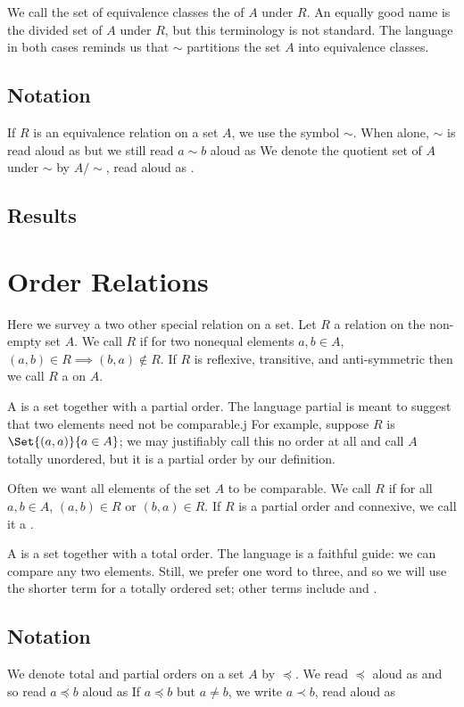 We call the set of equivalence classes the  of $A$ under $R$.
An equally good name is the divided set of $A$ under $R$, but this terminology is not standard.
The language in both cases reminds us that $\sim$ partitions the set $A$ into equivalence classes.

\subsection{Notation}
If $R$ is an equivalence relation on a set $A$, we use the symbol $\sim$.
When alone, $\sim$ is read aloud as  but we still read $a \sim b$ aloud as 
We denote the quotient set of  $A$ under $\sim$ by $A/\sim$, read aloud as .

\subsection{Results}

\section{Order Relations}

Here we survey a two other special relation on a set.
Let $R$ a relation on the non-empty set $A$.
We call $R$  if for two nonequal elements $a, b \in A$, $(a, b) \in R \implies (b, a) \not\in R$.
If $R$ is reflexive, transitive, and anti-symmetric then we call $R$ a  on $A$.

A  is a set together with a partial order.
The language partial is meant to suggest that two elements need not be comparable.j
For example, suppose $R$ is $\Set{(a,a)}{a \in A}$; we may justifiably call this no order at all and call $A$ totally unordered, but it is a partial order by our definition.

Often we want all elements of the set $A$ to be comparable.
We call $R$  if for all $a, b \in A$, $(a, b) \in R$ or $(b, a) \in R$.
If $R$ is a partial order and connexive, we call it a .


A  is a set together with a total order.
The language is a faithful guide: we can compare any two elements.
Still, we prefer one word to three, and so we will use the shorter term  for a totally ordered set; other terms include  and .

\subsection{Notation}
We denote total and partial orders on a set $A$ by $\preceq$.
We read $\preceq$ aloud as  and so read $a\preceq b$ aloud as 
If $a \preceq b$ but $a \neq b$, we write $a \prec b$, read aloud as 


